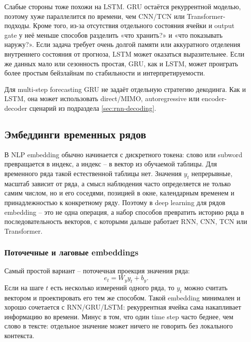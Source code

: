 \documentclass[12pt,fleqn]{article}
\begin{document}
Слабые стороны тоже похожи на LSTM.
GRU остаётся рекуррентной моделью, поэтому хуже параллелится по времени, чем CNN/TCN или Transformer-подходы.
Кроме того, из-за отсутствия отдельного состояния ячейки и output gate у неё меньше способов разделить «что хранить?» и «что показывать наружу?».
Если задача требует очень долгой памяти или аккуратного отделения внутреннего состояния от прогноза, LSTM может оказаться выразительнее.
Если же данных мало или сезонность простая, GRU, как и LSTM, может проиграть более простым бейзлайнам по стабильности и интерпретируемости.

Для multi-step forecasting GRU не задаёт отдельную стратегию декодинга.
Как и LSTM, она может использовать direct/MIMO, autoregressive или encoder-decoder сценарий из подраздела \ref{sec:rnn-decoding}.

\subsection{Эмбеддинги временных рядов}

В NLP embedding обычно начинается с дискретного токена: слово или subword превращается в индекс, а индекс -- в вектор из обучаемой таблицы.
Для временного ряда такой естественной таблицы нет.
Значения $y_t$ непрерывные, масштаб зависит от ряда, а смысл наблюдения часто определяется не только самим числом, но и его соседями, позицией в окне, календарным временем и принадлежностью к конкретному ряду.
Поэтому в deep learning для рядов embedding -- это не одна операция, а набор способов превратить историю ряда в последовательность векторов, с которыми дальше работает RNN, CNN, TCN или Transformer.

\subsubsection{Поточечные и лаговые embeddings}

Самый простой вариант -- поточечная проекция значения ряда:
\begin{equation}
  e_t = W_y y_t + b_y.
\end{equation}
Если на шаге $t$ есть несколько измерений одного ряда, то $y_t$ можно считать вектором и проектировать его тем же способом.
Такой embedding минимален и хорошо сочетается с RNN/GRU/LSTM: рекуррентная ячейка сама накапливает информацию во времени.
Минус в том, что один time step часто беднее, чем слово в тексте: отдельное значение может ничего не говорить без локального контекста.
\end{document}
